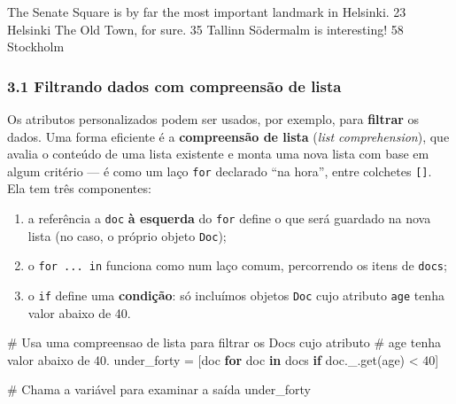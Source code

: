 \documentclass[
  brazilian,
  11pt,
]{article}
\newenvironment{Shaded}{\begin{snugshade}}{\end{snugshade}}
\newcommand{\CommentTok}[1]{\textcolor[rgb]{0.48,0.49,0.49}{#1}}
\newcommand{\ControlFlowTok}[1]{\textcolor[rgb]{0.99,0.74,0.29}{\textbf{#1}}}
\newcommand{\DecValTok}[1]{\textcolor[rgb]{0.96,0.45,0.00}{#1}}
\newcommand{\KeywordTok}[1]{\textcolor[rgb]{0.81,0.81,0.76}{\textbf{#1}}}
\newcommand{\NormalTok}[1]{\textcolor[rgb]{0.81,0.81,0.76}{#1}}
\newcommand{\OperatorTok}[1]{\textcolor[rgb]{0.81,0.81,0.76}{#1}}
\newcommand{\StringTok}[1]{\textcolor[rgb]{0.96,0.31,0.31}{#1}}
\providecommand{\tightlist}{%
  \setlength{\itemsep}{0pt}\setlength{\parskip}{0pt}}
\let\oldtexttt\texttt
\renewcommand{\texttt}[1]{{\color{inlink}\oldtexttt{#1}}}
\begin{document}
\begin{Shaded}
\begin{Highlighting}[]
\NormalTok{The Senate Square is by far the most important landmark in Helsinki. 23 Helsinki}
\NormalTok{The Old Town, for sure. 35 Tallinn}
\NormalTok{Södermalm is interesting! 58 Stockholm}
\end{Highlighting}
\end{Shaded}

\subsubsection{3.1 Filtrando dados com compreensão de
lista}\label{filtrando-dados-com-compreensuxe3o-de-lista}

Os atributos personalizados podem ser usados, por exemplo, para
\textbf{filtrar} os dados. Uma forma eficiente é a \textbf{compreensão
de lista} (\emph{list comprehension}), que avalia o conteúdo de uma
lista existente e monta uma nova lista com base em algum critério --- é
como um laço \texttt{for} declarado ``na hora'', entre colchetes
\texttt{{[}{]}}. Ela tem três componentes:

\begin{enumerate}
\def\labelenumi{\arabic{enumi}.}
\tightlist
\item
  a referência a \texttt{doc} \textbf{à esquerda} do \texttt{for} define
  o que será guardado na nova lista (no caso, o próprio objeto
  \texttt{Doc});
\item
  o \texttt{for\ ...\ in} funciona como num laço comum, percorrendo os
  itens de \texttt{docs};
\item
  o \texttt{if} define uma \textbf{condição}: só incluímos objetos
  \texttt{Doc} cujo atributo \texttt{age} tenha valor abaixo de 40.
\end{enumerate}

\begin{Shaded}
\begin{Highlighting}[]
\CommentTok{\# Usa uma compreensao de lista para filtrar os Docs cujo atributo}
\CommentTok{\# \textquotesingle{}age\textquotesingle{} tenha valor abaixo de 40.}
\NormalTok{under\_forty }\OperatorTok{=}\NormalTok{ [doc }\ControlFlowTok{for}\NormalTok{ doc }\KeywordTok{in}\NormalTok{ docs }\ControlFlowTok{if}\NormalTok{ doc.\_.get(}\StringTok{\textquotesingle{}age\textquotesingle{}}\NormalTok{) }\OperatorTok{\textless{}} \DecValTok{40}\NormalTok{]}

\CommentTok{\# Chama a variável para examinar a saída}
\NormalTok{under\_forty}
\end{Highlighting}
\end{Shaded}
\end{document}
